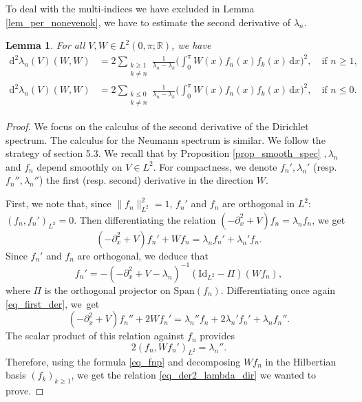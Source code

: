 \documentclass[11pt]{article}
\newcommand{\resp}{resp.\xspace}
\newtheorem{lemma}[theorem]{Lemma}
\theoremstyle{definition}
\begin{document}
To deal with the multi-indices we have excluded in Lemma \ref{lem_per_nonevenok}, we have to estimate the second derivative of $\lambda_n$.
\begin{lemma}
\label{lem_der2_lamb_abs}For all $V,W\in L^2(0,\pi;\mathbb{R})$, we have
\begin{align}
\label{eq_der2_lambda_dir}
\mathrm{d}^2\lambda_n(V)(W,W) &= 2\sum_{\substack{k \geq 1\\ k\neq n}} \frac1{\lambda_n - \lambda_k} \biggl(\int_0^\pi W(x) f_n(x) f_k(x) \, \mathrm{d}x \biggr)^2, \quad \text{if } n\geq 1,
\\
\label{eq_der2_lambda_neu}
\mathrm{d}^2\lambda_n(V)(W,W) &= 2\sum_{\substack{k \leq 0\\ k\neq n}} \frac1{\lambda_n - \lambda_k} \biggl(\int_0^\pi W(x) f_n(x) f_k(x) \, \mathrm{d}x \biggr)^2, \quad \text{if } n\leq 0.
\end{align}
\end{lemma}
\begin{proof}
We focus on the calculus of the second derivative of the Dirichlet spectrum. The calculus for the Neumann spectrum is similar. We follow the strategy of \cite{BG06} section 5.3. We recall that by Proposition \ref{prop_smooth_spec} $,\lambda_n$ and $f_n$ depend smoothly on $V\in L^2$. For compactness, we denote $f_n',\lambda_n'$ (\resp $f_n'',\lambda_n''$) the first (\resp second) derivative in the direction $W$.

First, we note that, since $\|f_n\|_{L^2}^2 \!=\! 1$, $f_n'$ and $f_n$ are orthogonal in $L^2$: $(f_n,f_n')_{L^2}\!=\!0$. Then differentiating the relation $(-\partial_x^2 +V)f_n = \lambda_n f_n $, we get
\begin{equation}
\label{eq_first_der}
(-\partial_x^2 +V)f_n' + W f_n= \lambda_n f_n' + \lambda_n' f_n.
\end{equation}
Since $f_n'$ and $f_n$ are orthogonal, we deduce that
\begin{equation}
\label{eq_fnp}
f_n'= -(-\partial_x^2 +V - \lambda_n)^{-1} (\mathrm{Id}_{L^2} - \Pi)(W f_n),
\end{equation}
where $\Pi$ is the orthogonal projector on $\mathrm{Span}(f_n)$. Differentiating once again \eqref{eq_first_der}, we~get
\[
(-\partial_x^2 +V)f_n'' +2 W f_n'=\lambda_n'' f_n + 2\lambda_n' f_n' +\lambda_n f_n''.
\]
The scalar product of this relation against $f_n$ provides
\[
2 (f_n,W f_n')_{L^2} = \lambda_n''.
\]
Therefore, using the formula \eqref{eq_fnp} and decomposing $W f_n$ in the Hilbertian basis $(f_k)_{k\geq 1}$, we get the relation \eqref{eq_der2_lambda_dir} we wanted to prove.
\end{proof}
\end{document}
